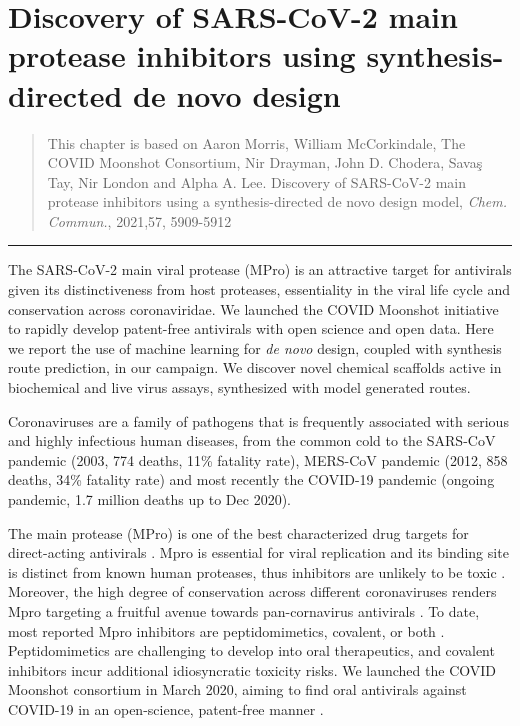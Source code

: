 \chapter{Discovery of SARS-CoV-2 main protease inhibitors using synthesis-directed de novo design} \label{ch:ranking}

\begin{quote}
    This chapter is based on Aaron Morris, William McCorkindale, The COVID Moonshot Consortium, Nir Drayman, John D. Chodera, Savaş Tay, Nir London and Alpha A. Lee. Discovery of SARS-CoV-2 main protease inhibitors using a synthesis-directed de novo design model, \textit{Chem. Commun.}, 2021,57, 5909-5912 
\end{quote}

\noindent\hfil\rule{0.5\textwidth}{.4pt}\hfil

The SARS-CoV-2 main viral protease (MPro) is an attractive target for antivirals given its distinctiveness from host proteases, essentiality in the viral life cycle and conservation across coronaviridae. We launched the COVID Moonshot initiative to rapidly develop patent-free antivirals with open science and open data. Here we report the use of machine learning for \emph{de novo} design, coupled with synthesis route prediction, in our campaign. We discover novel chemical scaffolds active in biochemical and live virus assays, synthesized with model generated routes.

Coronaviruses are a family of pathogens that is frequently associated with serious and highly infectious human diseases, from the common cold to the SARS-CoV pandemic (2003, 774 deaths, 11\% fatality rate), MERS-CoV pandemic (2012, 858 deaths, 34\% fatality rate) and most recently the COVID-19 pandemic (ongoing pandemic, 1.7 million deaths up to Dec 2020).

The main protease (MPro) is one of the best characterized drug targets for direct-acting antivirals \cite{pillaiyar2016overview,cannalire2020targeting}. Mpro is essential for viral replication and its binding site is distinct from known human proteases, thus inhibitors are unlikely to be toxic \cite{jin2020structure,liu2020development}. Moreover, the high degree of conservation across different coronaviruses renders Mpro targeting a fruitful avenue towards pan-cornavirus antivirals \cite{ullrich2020sars}. To date, most reported Mpro inhibitors are peptidomimetics, covalent, or both \cite{cannalire2020targeting}. Peptidomimetics are challenging to develop into oral therapeutics, and covalent inhibitors incur additional idiosyncratic toxicity risks. We launched the COVID Moonshot consortium in March 2020, aiming to find oral antivirals against COVID-19 in an open-science, patent-free manner \cite{chodera2020crowdsourcing}.

